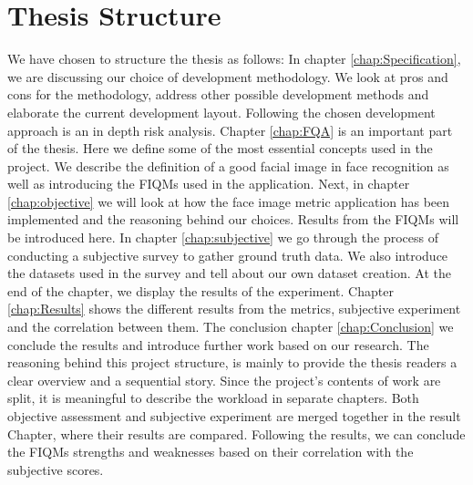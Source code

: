 \section{Thesis Structure}
We have chosen to structure the thesis as follows: In chapter \ref{chap:Specification}, we are discussing our choice of development methodology. We look at pros and cons for the methodology, address other possible development methods and elaborate the current development layout. Following the chosen development approach is an in depth risk analysis. Chapter \ref{chap:FQA} is an important part of the thesis. Here we define some of the most essential concepts used in the project. We describe the definition of a good facial image in face recognition as well as introducing the FIQMs used in the application. Next, in chapter \ref{chap:objective} we will look at how the face image metric application has been implemented and the reasoning behind our choices. Results from the FIQMs will be introduced here. In chapter \ref{chap:subjective} we go through the process of conducting a subjective survey to gather ground truth data. We also introduce the datasets used in the survey and tell about our own dataset creation. At the end of the chapter, we display the results of the experiment. 
Chapter \ref{chap:Results} shows the different results from the metrics, subjective experiment and the correlation between them. The conclusion chapter \ref{chap:Conclusion} we conclude the results and introduce further work based on our research. 
The reasoning behind this project structure, is mainly to provide the thesis readers a clear overview and a sequential story. Since the project's contents of work are split, it is meaningful to describe the workload in separate chapters. Both objective assessment and subjective experiment are merged together in the result Chapter, where their results are compared. Following the results, we can conclude the FIQMs strengths and weaknesses based on their correlation with the subjective scores.   

